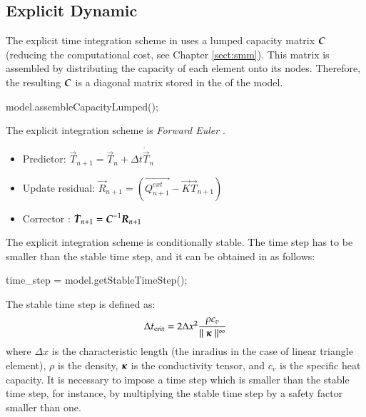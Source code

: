 \subsection{Explicit Dynamic}

The explicit  time integration scheme in \akantu  uses a lumped capacity
matrix $\boldsymbol{C}$ (reducing the computational  cost, see Chapter \ref{sect:smm}).
This matrix is assembled by
distributing the capacity of each element onto its nodes. Therefore, the resulting $\boldsymbol{C}$ is a diagonal matrix stored in the   of the model.

\begin{cpp}
  model.assembleCapacityLumped();
\end{cpp}

 The explicit integration scheme is  \emph{Forward Euler}
\cite{curnier92a}.

\begin{itemize}
\item Predictor: $\vec{T}_{n+1} = \vec{T}_{n} + \Delta t \dot{\vec{T}}_{n}$
\item Update residual: $\vec{R}_{n+1} = \left( \vec{Q^{ext}_{n+1}} - \vec{K}\vec{T}_{n+1} \right)$
\item Corrector : $\dot{\boldsymbol{T}}_{n+1} = \boldsymbol{C}^{-1} \boldsymbol{R}_{n+1}$
\end{itemize}

The explicit integration scheme is conditionally stable. The time step has to be smaller than the stable time step,
and it can be obtained in \akantu as follows:

\begin{cpp}
  time_step = model.getStableTimeStep();
\end{cpp}

The stable time step is defined as:
\begin{equation}\label{eqn:htm:explicit:stabletime}
  \Delta t_{{\mathrm{crit}}} = 2 \Delta x^2 \frac{\rho c_v}{\mid\mid \boldsymbol{\kappa} \mid\mid^\infty}
\end{equation}
where $\Delta x$ is the characteristic length (\eg the inradius in the
case of linear triangle element), $\rho$ is the density,
$\boldsymbol{\kappa}$ is the conductivity tensor, and $c_v$ is the specific
heat capacity. It is necessary to impose a time step which is smaller
than the stable time step, for instance, by multiplying the stable
time step by a safety factor smaller than one.

